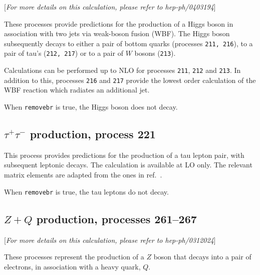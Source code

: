 \documentclass[12pt]{article}
\begin{document}
\begin{center}
[{\it For more details on this calculation, please refer to hep-ph/0403194}]
\end{center}

These processes provide predictions for the production of a Higgs boson in
association with two jets via weak-boson fusion (WBF). The Higgs boson
subsequently decays to either a pair of bottom quarks
(processes {\tt 211, 216}), to a pair of tau's ({\tt 212, 217}) or to
a pair of $W$ bosons ({\tt 213}).

Calculations can be performed up to NLO for processes {\tt 211}, {\tt 212} and {\tt 213}.
In addition to this, processes {\tt 216} and {\tt 217} provide the lowest
order calculation of the WBF reaction which radiates an additional jet. 

When {\tt removebr} is true, the Higgs boson does not decay.

\subsection{$\tau^+\tau^-$ production, process 221}
\label{subsec:tautau}

This process provides predictions for the production of a tau lepton
pair, with subsequent leptonic decays. The calculation is available at LO
only. The relevant matrix elements are adapted from the ones in
ref.~\cite{Kleiss:1988xr}.

When {\tt removebr} is true, the tau leptons do not decay.

\subsection{$Z+Q$ production, processes 261--267}
\label{subsec:ZQ}

\begin{center}
[{\it For more details on this calculation, please refer to hep-ph/0312024}]
\end{center}

These processes represent the production of a $Z$
boson that decays into a pair of electrons,
in association with a heavy quark, $Q$.
\end{document}
